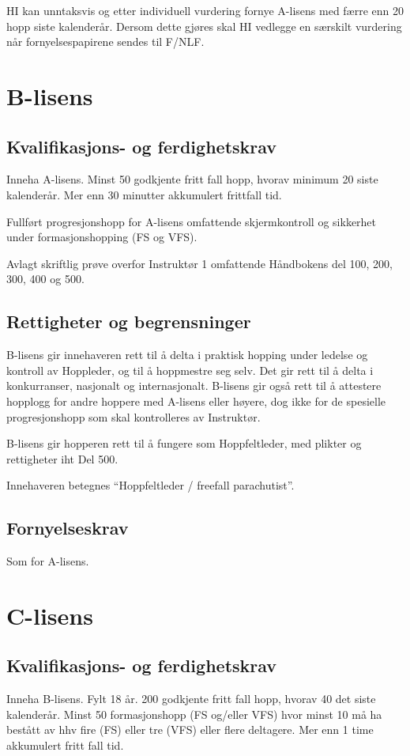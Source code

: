 HI kan unntaksvis og etter individuell vurdering fornye A-lisens med færre enn 20 hopp siste kalenderår. Dersom dette gjøres skal HI vedlegge en særskilt vurdering når fornyelsespapirene sendes til F/NLF.

\section{B-lisens}
\subsection{Kvalifikasjons- og ferdighetskrav}
Inneha A-lisens. Minst 50 godkjente fritt fall hopp, hvorav minimum 20 siste kalenderår. Mer enn 30 minutter akkumulert frittfall tid.

Fullført progresjonshopp for A-lisens omfattende skjermkontroll og sikkerhet under formasjonshopping (FS og VFS).

Avlagt skriftlig prøve overfor Instruktør 1 omfattende Håndbokens del 100, 200, 300, 400 og 500.

\subsection{Rettigheter og begrensninger}
B-lisens gir innehaveren rett til å delta i praktisk hopping under ledelse og kontroll av Hoppleder, og til å hoppmestre seg selv. Det gir rett til å delta i konkurranser, nasjonalt og internasjonalt. B-lisens gir også rett til å attestere hopplogg for andre hoppere med A-lisens eller høyere, dog ikke for de spesielle progresjonshopp som skal kontrolleres av Instruktør.

B-lisens gir hopperen rett til å fungere som Hoppfeltleder, med plikter og rettigheter iht Del 500.

Innehaveren betegnes ``Hoppfeltleder / freefall parachutist''.

\subsection{Fornyelseskrav}
Som for A-lisens.

\section{C-lisens}
\subsection{Kvalifikasjons- og ferdighetskrav}
Inneha B-lisens. Fylt 18 år. 200 godkjente fritt fall hopp, hvorav 40 det siste kalenderår. Minst 50 formasjonshopp (FS og/eller VFS) hvor minst 10 må ha bestått av hhv fire (FS) eller tre (VFS) eller flere deltagere. Mer enn 1 time akkumulert fritt fall tid.

